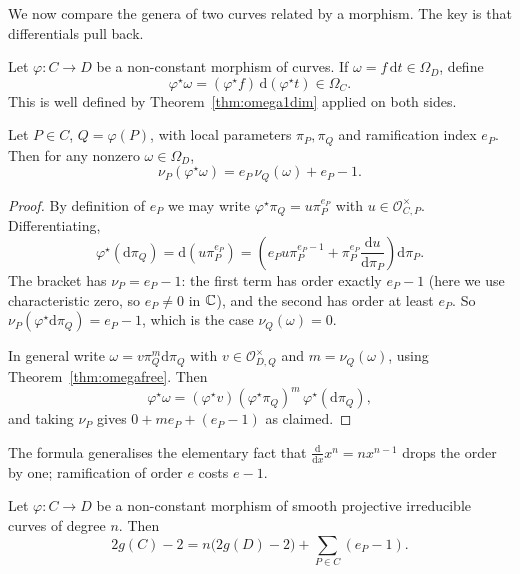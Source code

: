 \documentclass[a4paper]{scrartcl}
\newcommand{\Oh}{\mathcal{O}}
\newcommand{\dee}{\mathrm{d}}
\begin{document}
We now compare the genera of two curves related by a morphism. The key is that differentials pull back.

Let $\varphi \colon C \to D$ be a non-constant morphism of curves. If $\omega = f\,\dee t \in \Omega_D$, define
$$\varphi^\star\omega = (\varphi^\star f)\,\dee(\varphi^\star t) \in \Omega_C.$$
This is well defined by Theorem~\ref{thm:omega1dim} applied on both sides.

\begin{lemma}\label{lem:pullbackdiff}
	Let $P \in C$, $Q = \varphi(P)$, with local parameters $\pi_P,\pi_Q$ and ramification index $e_P$. Then for any nonzero $\omega \in \Omega_D$,
	$$\nu_P(\varphi^\star\omega) = e_P\,\nu_Q(\omega) + e_P - 1.$$
\end{lemma}

\begin{proof}
	By definition of $e_P$ we may write $\varphi^\star\pi_Q = u\pi_P^{e_P}$ with $u \in \Oh_{C,P}^\times$. Differentiating,
	$$\varphi^\star(\dee\pi_Q) = \dee(u\pi_P^{e_P}) = \left(e_Pu\pi_P^{e_P-1} + \pi_P^{e_P}\frac{\dee u}{\dee \pi_P}\right)\dee\pi_P.$$
	The bracket has $\nu_P = e_P - 1$: the first term has order exactly $e_P-1$ (here we use characteristic zero, so $e_P \neq 0$ in $\mathbb{C}$), and the second has order at least $e_P$. So $\nu_P(\varphi^\star\dee\pi_Q) = e_P-1$, which is the case $\nu_Q(\omega) = 0$.

	In general write $\omega = v\pi_Q^m\dee\pi_Q$ with $v \in \Oh_{D,Q}^\times$ and $m = \nu_Q(\omega)$, using Theorem~\ref{thm:omegafree}. Then
	$$\varphi^\star\omega = (\varphi^\star v)(\varphi^\star\pi_Q)^m\,\varphi^\star(\dee\pi_Q),$$
	and taking $\nu_P$ gives $0 + me_P + (e_P-1)$ as claimed.
\end{proof}

The formula generalises the elementary fact that $\frac{\dee}{\dee x}x^n = nx^{n-1}$ drops the order by one; ramification of order $e$ costs $e-1$.

\begin{theorem}\label{ag-thm:RH}
	Let $\varphi \colon C \to D$ be a non-constant morphism of smooth projective irreducible curves of degree $n$. Then
	$$2g(C) - 2 = n\big(2g(D) - 2\big) + \sum_{P \in C}(e_P - 1).$$
\end{theorem}
\end{document}
